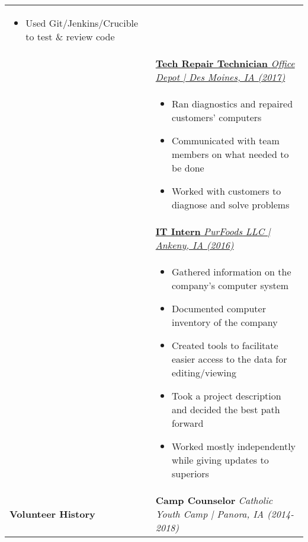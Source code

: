 \documentclass[11pt]{article}
\begin{document}
\begin{small}
\begin{tabularx}{\textwidth}{lX}
\begin{itemize}[noitemsep, nolistsep]
			\item Used Git/Jenkins/Crucible to test \& review code
		\end{itemize}\\
		&\uline{\textbf{Tech Repair Technician} \hfill \textit{Office Depot | Des Moines, IA (2017)}}\\
		& \vspace{-0.7\topsep}
		\begin{itemize}[noitemsep, nolistsep]
			\item Ran diagnostics and repaired customers' computers
			\item Communicated with team members on what needed to be done
			\item Worked with customers to diagnose and solve problems
		\end{itemize} \\
		& \uline{\textbf{IT Intern} \hfill \textit{PurFoods LLC | Ankeny, IA (2016)}} \\
		& \vspace{-0.7\topsep}
		\begin{itemize}[noitemsep, nolistsep]
			\item Gathered information on the company's computer system
			\item Documented computer inventory of the company
			\item Created tools to facilitate easier access to the data for editing/viewing
			\item Took a project description and decided the best path forward
			\item Worked mostly independently while giving updates to superiors
		\end{itemize}\\
		\begin{large}\textbf{Volunteer History}\end{large} & \textbf{Camp Counselor} \hfill \textit{Catholic Youth Camp | Panora, IA (2014-2018)}\\
	\end{tabularx}
	\end{small}
\end{document}
